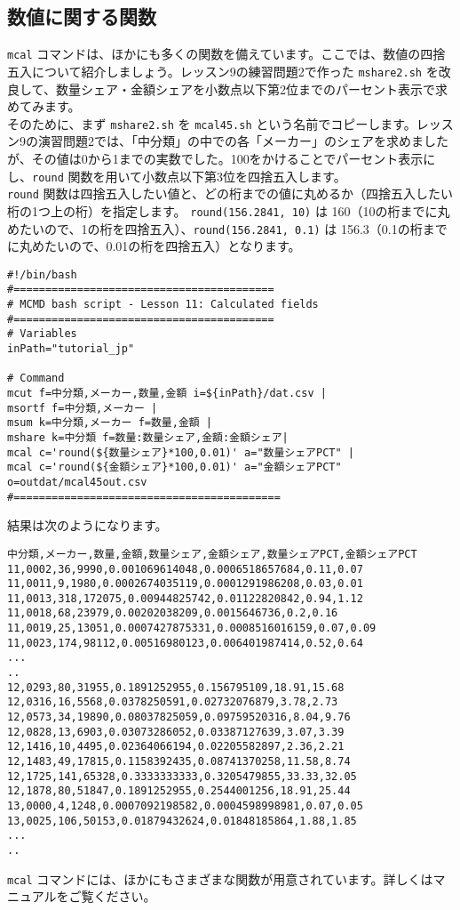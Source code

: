\subsection{数値に関する関数}

\verb|mcal| コマンドは、ほかにも多くの関数を備えています。ここでは、数値の四捨五入について紹介しましょう。レッスン9の練習問題2で作った \verb|mshare2.sh| を改良して、数量シェア・金額シェアを小数点以下第2位までのパーセント表示で求めてみます。\\

そのために、まず \verb|mshare2.sh| を \verb|mcal45.sh| という名前でコピーします。レッスン9の演習問題2では、「中分類」の中での各「メーカー」のシェアを求めましたが、その値は0から1までの実数でした。100をかけることでパーセント表示にし、\verb|round| 関数を用いて小数点以下第3位を四捨五入します。\\

\verb|round| 関数は四捨五入したい値と、どの桁までの値に丸めるか（四捨五入したい桁の1つ上の桁）を指定します。
\verb|round(156.2841, 10)| は 160（10の桁までに丸めたいので、1の桁を四捨五入）、\verb|round(156.2841, 0.1)| は 156.3（0.1の桁までに丸めたいので、0.01の桁を四捨五入）となります。\\

\begin{verbatim}
#!/bin/bash
#=========================================
# MCMD bash script - Lesson 11: Calculated fields
#=========================================
# Variables
inPath="tutorial_jp"

# Command 
mcut f=中分類,メーカー,数量,金額 i=${inPath}/dat.csv |
msortf f=中分類,メーカー |   
msum k=中分類,メーカー f=数量,金額 |   
mshare k=中分類 f=数量:数量シェア,金額:金額シェア| 
mcal c='round(${数量シェア}*100,0.01)' a="数量シェアPCT" |
mcal c='round(${金額シェア}*100,0.01)' a="金額シェアPCT" o=outdat/mcal45out.csv
#==========================================
\end{verbatim}

結果は次のようになります。

\begin{verbatim}
中分類,メーカー,数量,金額,数量シェア,金額シェア,数量シェアPCT,金額シェアPCT
11,0002,36,9990,0.001069614048,0.0006518657684,0.11,0.07
11,0011,9,1980,0.0002674035119,0.0001291986208,0.03,0.01
11,0013,318,172075,0.00944825742,0.01122820842,0.94,1.12
11,0018,68,23979,0.00202038209,0.0015646736,0.2,0.16
11,0019,25,13051,0.0007427875331,0.0008516016159,0.07,0.09
11,0023,174,98112,0.00516980123,0.006401987414,0.52,0.64
...
..
12,0293,80,31955,0.1891252955,0.156795109,18.91,15.68
12,0316,16,5568,0.0378250591,0.02732076879,3.78,2.73
12,0573,34,19890,0.08037825059,0.09759520316,8.04,9.76
12,0828,13,6903,0.03073286052,0.03387127639,3.07,3.39
12,1416,10,4495,0.02364066194,0.02205582897,2.36,2.21
12,1483,49,17815,0.1158392435,0.08741370258,11.58,8.74
12,1725,141,65328,0.3333333333,0.3205479855,33.33,32.05
12,1878,80,51847,0.1891252955,0.2544001256,18.91,25.44
13,0000,4,1248,0.0007092198582,0.0004598998981,0.07,0.05
13,0025,106,50153,0.01879432624,0.01848185864,1.88,1.85
...
..
\end{verbatim}
\verb|mcal| コマンドには、ほかにもさまざまな関数が用意されています。詳しくはマニュアルをご覧ください。

